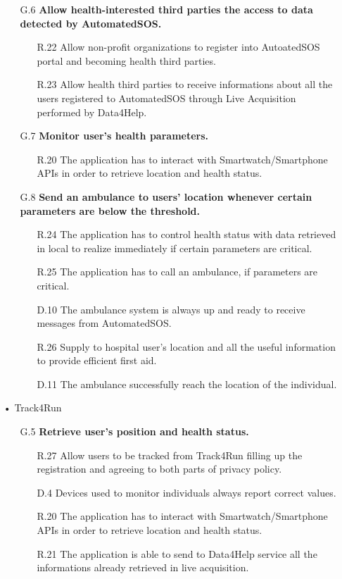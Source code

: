 \begin{enumerate}
\begin{enumerate}
	\item [G.6] \textbf{Allow health-interested third parties the access to data detected by AutomatedSOS.}
		\begin{enumerate}
		\item [R.22] Allow non-profit organizations to register into AutoatedSOS portal and becoming health third parties.
		\item [R.23] Allow health third parties to receive informations about all the users registered to AutomatedSOS through Live Acquisition performed by Data4Help.
		\end{enumerate}
	
	\item [G.7] \textbf{Monitor user's health parameters.}
		\begin{enumerate}
		\item [R.20] The application has to interact with Smartwatch/Smartphone APIs in order to retrieve location and health status.
		\end{enumerate}
		
	\item [G.8] \textbf{Send an ambulance to users' location whenever certain parameters are below the threshold.}
		\begin{enumerate}
		\item [R.24] The application has to control health status with data retrieved in local to realize immediately if certain parameters are critical.
		\item [R.25] The application has to call an ambulance, if parameters are critical.
		\item [D.10] The ambulance system is always up and ready to receive messages from AutomatedSOS.
		\item [R.26] Supply to hospital user's location and all the useful information to provide efficient first aid.
		\item [D.11] The ambulance successfully reach the location of the individual.
		\end{enumerate}
		
  	\end{enumerate}
  	
  	
\item[•]{\Large Track4Run}
	
	\begin{enumerate}
	\item [G.5] \textbf{Retrieve user's position and health status.}
		\begin{enumerate}
		\item [R.27] Allow users to be tracked from Track4Run filling up the registration and agreeing to both parts of privacy policy.
		\item [D.4] Devices used to monitor individuals always report correct values.
		\item [R.20] The application has to interact with Smartwatch/Smartphone APIs in order to retrieve location and health status.
		\item [R.21] The application is able to send to Data4Help service all the informations already retrieved in live acquisition.
		\end{enumerate}
		

\end{enumerate}
\end{enumerate}
